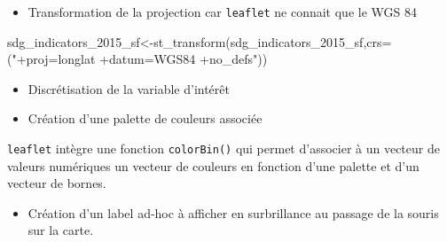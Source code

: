 \documentclass[
]{book}
\newenvironment{Shaded}{\begin{snugshade}}{\end{snugshade}}
\newcommand{\AttributeTok}[1]{\textcolor[rgb]{0.77,0.63,0.00}{#1}}
\newcommand{\FunctionTok}[1]{\textcolor[rgb]{0.00,0.00,0.00}{#1}}
\newcommand{\NormalTok}[1]{#1}
\newcommand{\OtherTok}[1]{\textcolor[rgb]{0.56,0.35,0.01}{#1}}
\newcommand{\SpecialCharTok}[1]{\textcolor[rgb]{0.00,0.00,0.00}{#1}}
\newcommand{\StringTok}[1]{\textcolor[rgb]{0.31,0.60,0.02}{#1}}
\providecommand{\tightlist}{%
  \setlength{\itemsep}{0pt}\setlength{\parskip}{0pt}}
\begin{document}
\begin{itemize}
\tightlist
\item
  Transformation de la projection car \texttt{leaflet} ne connait que le WGS 84
\end{itemize}

\begin{Shaded}
\begin{Highlighting}[]
\NormalTok{sdg\_indicators\_2015\_sf}\OtherTok{\textless{}{-}}\FunctionTok{st\_transform}\NormalTok{(sdg\_indicators\_2015\_sf,}\AttributeTok{crs=}\NormalTok{(}\StringTok{"+proj=longlat +datum=WGS84 +no\_defs"}\NormalTok{))}
\end{Highlighting}
\end{Shaded}

\begin{itemize}
\tightlist
\item
  Discrétisation de la variable d'intérêt
\end{itemize}

\begin{Shaded}
\end{Shaded}

\begin{itemize}
\tightlist
\item
  Création d'une palette de couleurs associée
\end{itemize}

\texttt{leaflet} intègre une fonction \texttt{colorBin()} qui permet d'associer à un vecteur de valeurs numériques un vecteur de couleurs en fonction d'une palette et d'un vecteur de bornes.

\begin{Shaded}
\end{Shaded}

\begin{itemize}
\tightlist
\item
  Création d'un label ad-hoc à afficher en surbrillance au passage de la souris sur la carte.
\end{itemize}
\end{document}

